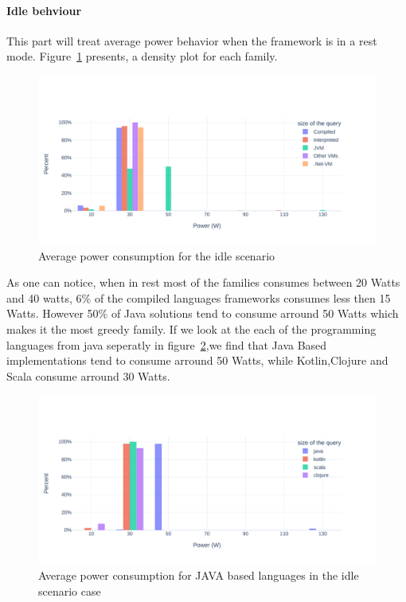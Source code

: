 \paragraph{Idle behviour}
This part will treat average power behavior when the framework is in a rest mode. Figure~\ref{fig:av_power_idle} presents, a density plot for each family.

\begin{figure}[bht]
    \centering
    \includegraphics[width=1.0\columnwidth]{imgs/av_power_idle}
    \caption{Average power consumption for the idle scenario}
    \label{fig:av_power_idle}
\end{figure}
As one can notice, when in rest most of the families consumes between 20 Watts and 40 watts, 6\% of the compiled languages frameworks consumes less then 15 Watts. However 50\% of Java solutions tend to consume arround 50 Watts which makes it the most greedy family.
If we look at the each of the programming languages from java seperatly in figure~\ref{fig:av_power_java_idle},we find that Java Based implementations tend to consume arround 50 Watts, while Kotlin,Clojure and Scala consume arround 30 Watts.

\begin{figure}[bht]
    \centering
    \includegraphics[width=1.0\columnwidth]{imgs/av_power_java_idle}
    \caption{Average power consumption for  JAVA based languages in the idle scenario case}
    \label{fig:av_power_java_idle}
\end{figure}

